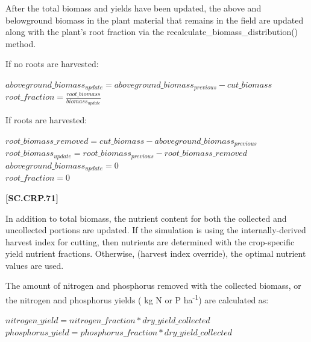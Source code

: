 After the total biomass and yields have been updated, the above and belowground biomass in the plant material that remains in the field are updated along with the plant’s root fraction via the recalculate\_biomass\_distribution() method. 

If no roots are harvested:
   \vspace{0.2cm}

    \begin{center}
        \(aboveground\_biomass_{update}=aboveground\_biomass_{previous}- cut\_biomass\)\\ 
        \(root\_fraction=\frac{root\_biomass}{biomass_{update}}\)
    \end{center}
        \vspace{0.5cm}

If roots are harvested:
   \vspace{0.2cm}

    \begin{center}
        \(root\_biomass\_removed= cut\_biomass- aboveground\_biomass_{previous}\)\\ 
        \(root\_biomass_{update}= root\_biomass_{previous}- root\_biomass\_removed\)\\        \(aboveground\_biomass_{update}= 0\)\\
        \(root\_fraction= 0\)
    \end{center}
        \vspace{0.5cm}
    
            {\raggedleft \textbf{[SC.CRP.71]}\par}
            \vspace{0.5cm}

In addition to total biomass, the nutrient content for both the collected and uncollected portions are updated. If the simulation is using the internally-derived harvest index for cutting, then nutrients are determined with the crop-specific yield nutrient fractions. Otherwise, (harvest index override), the optimal nutrient values are used.

The amount of nitrogen and phosphorus removed with the collected biomass, or the nitrogen and phosphorus yields ( kg N or P ha\textsuperscript{-1}) are calculated as:
   \vspace{0.2cm}

    \begin{center}
        \(nitrogen\_yield=nitrogen\_fraction * dry\_yield\_collected\)\\ 
        \(phosphorus\_yield=phosphorus\_fraction * dry\_yield\_collected\)        
    \end{center}
        \vspace{0.5cm}
    
